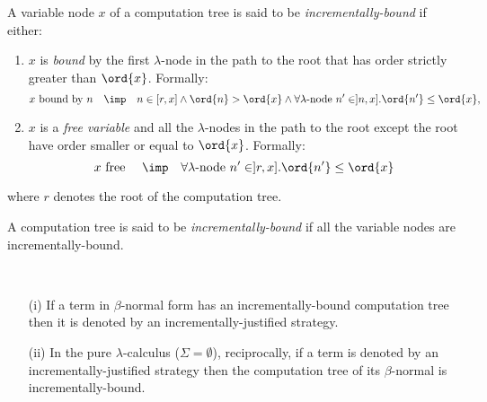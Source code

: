 \begin{dfn}
A variable node $x$ of a computation tree is said to be \emph{incrementally-bound} if either:
\begin{enumerate}
\item $x$ is \emph{bound} by the first $\lambda$-node in the path to the root that has
order strictly greater than $\ord{x}$. Formally:
$$ x \mbox{ bound by } n \quad \imp \quad n \in [r,x] \wedge \ord{n} > \ord{x} \wedge \forall \lambda\mbox{-node } n' \in ]n,x] . \ord{n'} \leq \ord{x},$$

\item $x$ is a \emph{free variable} and all the $\lambda$-nodes in the path to the root except the root have order
smaller or equal to $\ord{x}$. Formally:
$$ x \mbox{ free } \quad \imp \quad  \forall \lambda\mbox{-node } n' \in ]r,x] . \ord{n'} \leq \ord{x}$$
\end{enumerate}
where $r$ denotes the root of the computation tree.

A computation tree is said to be \emph{incrementally-bound} if all the variable nodes are incrementally-bound.
\end{dfn}

\begin{prop} \
\label{prop:incrbound_imp_incrjustified}
\begin{enumerate}
\item[(i)] If a term in $\beta$-normal form has an incrementally-bound computation tree then it is denoted by an incrementally-justified strategy.
\item[(ii)] In the pure $\lambda$-calculus ($\Sigma=\emptyset$), reciprocally, if a term is denoted by an incrementally-justified strategy then
the computation tree of its $\beta$-normal is incrementally-bound.
\end{enumerate}
\end{prop}

